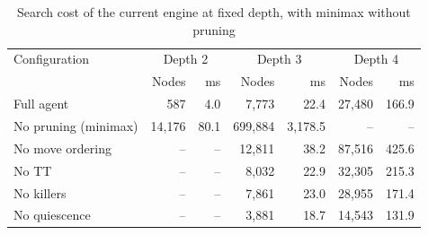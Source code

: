 \begin{table}[!htbp]
\centering\caption{Search cost of the current engine at fixed depth, with minimax without pruning}\label{tab:cost-final}
\footnotesize
\begin{tabular}{@{}lrrrrrr@{}}
\toprule
Configuration & \multicolumn{2}{c}{Depth 2} & \multicolumn{2}{c}{Depth 3} & \multicolumn{2}{c}{Depth 4} \\ & Nodes & ms & Nodes & ms & Nodes & ms \\
\midrule
Full agent & 587 & 4.0 & 7,773 & 22.4 & 27,480 & 166.9 \\
No pruning (minimax) & 14,176 & 80.1 & 699,884 & 3,178.5 & -- & -- \\
No move ordering & -- & -- & 12,811 & 38.2 & 87,516 & 425.6 \\
No TT & -- & -- & 8,032 & 22.9 & 32,305 & 215.3 \\
No killers & -- & -- & 7,861 & 23.0 & 28,955 & 171.4 \\
No quiescence & -- & -- & 3,881 & 18.7 & 14,543 & 131.9 \\
\bottomrule
\end{tabular}
\par{}
\end{table}
